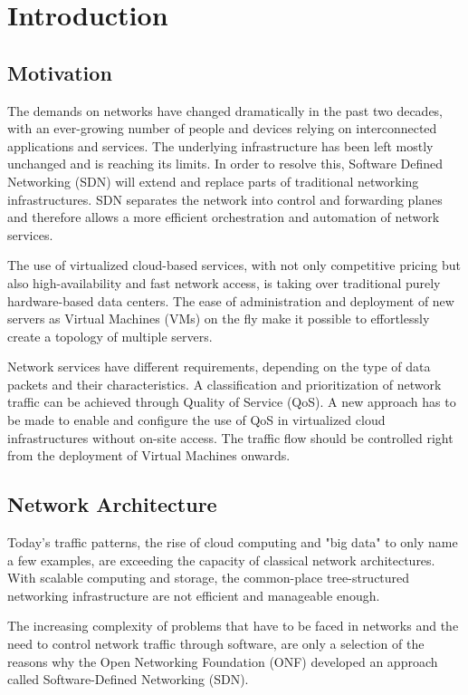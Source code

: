 \chapter{Introduction}
\label{chapter_introduction}



\section{Motivation}

The demands on networks have changed dramatically in the past two decades, with an ever-growing number of people and devices relying on interconnected applications and services. The underlying infrastructure has been left mostly unchanged and is reaching its limits. In order to resolve this, Software Defined Networking (SDN) will extend and replace parts of traditional networking infrastructures. SDN separates the network into control and forwarding planes and therefore allows a more efficient orchestration and automation of network services.

The use of virtualized cloud-based services, with not only competitive pricing but also high-availability and fast network access,  is taking over traditional purely hardware-based data centers. The ease of administration and deployment of new servers as Virtual Machines (VMs) on the fly make it possible to effortlessly create a topology of multiple servers. %

Network services have different requirements, depending on the type of data packets and their characteristics. A classification and prioritization of network traffic can be achieved through Quality of Service (QoS). A new approach has to be made to enable and configure the use of QoS in virtualized cloud infrastructures without on-site access. The traffic flow should be controlled right from the deployment of Virtual Machines onwards.


\section{Network Architecture}
Today's traffic patterns, the rise of cloud computing and "big data" to only name a few examples, are exceeding the capacity of classical network architectures. With scalable computing and storage, the common-place tree-structured networking infrastructure are not efficient and manageable enough. 

The increasing complexity of problems that have to be faced in networks and the need to control network traffic through software, are only a selection of the reasons why the Open Networking Foundation (ONF) developed an approach called Software-Defined Networking (SDN).

